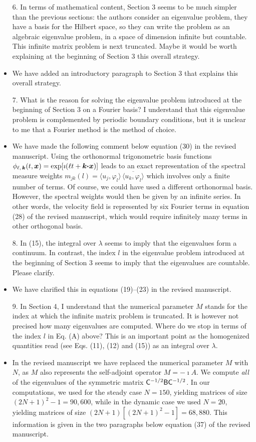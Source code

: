 \documentclass[amsa]{article}
\begin{document}
\begin{itemize}
\item[6.] In terms of mathematical content, Section 3 seems to be much
  simpler than the previous sections: the authors consider an
  eigenvalue problem, they have a basis for the Hilbert space, so they
  can write the problem as an algebraic eigenvalue problem, in a space
  of dimension infinite but countable. This infinite matrix problem is
  next truncated. Maybe it would be worth explaining at the beginning
  of Section 3 this overall strategy.
%
\item We have added an introductory paragraph to Section 3 that
  explains this overall strategy.
%
\item[7.] What is the reason for solving the eigenvalue problem
  introduced at the beginning of Section 3 on a Fourier basis? I
  understand that this eigenvalue problem is complemented by periodic
  boundary conditions, but it is unclear to me that a Fourier method
  is the method of choice. 
%
\item We have made the following comment below equation (30) in the
  revised manuscript. Using the orthonormal trigonometric basis
  functions $\phi_{\ell,\,\boldsymbol{k}}(t,\boldsymbol{x})=\exp[\imath(\ell t+\boldsymbol{k}\mbox{\boldmath${\cdot}$}\boldsymbol{x})]$
  leads to an exact representation of the spectral measure weights
  $m_{jk}(l)=\langle u_j,\varphi_l\rangle\,\overline{\langle u_k,\varphi_l\rangle}$ which involves only a
  finite number of terms. Of course, we could have used a different
  orthonormal basis. However, the spectral weights would then be given
  by an infinite series. In other words, the velocity field is
  represented by six Fourier terms in equation (28) of the revised
  manuscript, which would require infinitely many terms in other
  orthogonal basis.
%
\item[8.] In (15), the integral over $\lambda$ seems to imply that the
  eigenvalues form a continuum. In contrast, the index $l$ in the
  eigenvalue problem introduced at the beginning of Section 3 seems to
  imply that the eigenvalues are countable. Please clarify.
%  
\item We have clarified this in equations (19)--(23) in the revised
  manuscript. 
%
\item[9.] In Section 4, I understand that the numerical parameter $M$
  stands for the index at which the infinite matrix problem is
  truncated. It is however not precised how many eigenvalues are
  computed. Where do we stop in terms of the index $l$ in Eq. (A)
  above? This is an important point as the homogenized quantities read
  (see Eqs. (11), (12) and (15)) as an integral over $\lambda$.
%
\item In the revised manuscript we have replaced the numerical
  parameter $M$ with $N$, as $M$ also represents the self-adjoint
  operator $M=-\imath A$. We compute \emph{all} of the eigenvalues of the
  symmetric matrix $\mathsf{C}^{-1/2}\mathsf{B}\mathsf{C}^{-1/2}$. In our computations, we
  used for the steady case $N=150$, yielding matrices of size
  $(2N+1)^2-1=90,600$, while in the dynamic case we used $N=20$,
  yielding matrices of size $(2N+1)[(2N+1)^2-1]=68,880$. This
  information is given in the two paragraphs below equation (37) of
  the revised manuscript.   
%
\end{itemize}  
  
\end{document}
